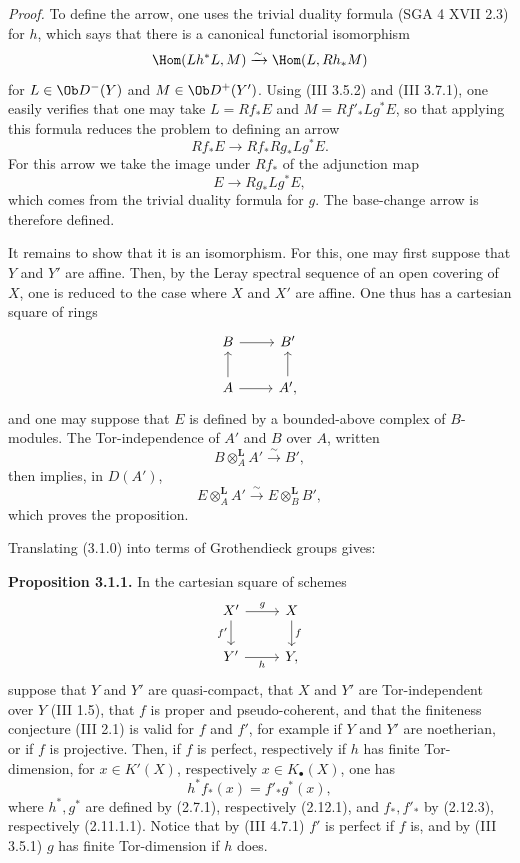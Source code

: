 \documentclass[11pt]{article}
\begin{document}
\emph{Proof.} To define the arrow, one uses the trivial duality formula (SGA 4 XVII 2.3) for \(h\), which says that there is a canonical functorial isomorphism
\[
 \Hom(Lh^*L,M)\xrightarrow{\sim}\Hom(L,Rh_*M)
\]
for \(L\in\Ob D^-(Y)\) and \(M\in\Ob D^+(Y')\). Using (III 3.5.2) and (III 3.7.1), one easily verifies that one may take \(L=Rf_*E\) and \(M=Rf'_*Lg^*E\), so that applying this formula reduces the problem to defining an arrow
\[
 Rf_*E\longrightarrow Rf_*Rg_*Lg^*E.
\]
For this arrow we take the image under \(Rf_*\) of the adjunction map
\[
 E\longrightarrow Rg_*Lg^*E,
\]
which comes from the trivial duality formula for \(g\). The base-change arrow is therefore defined.

It remains to show that it is an isomorphism. For this, one may first suppose that \(Y\) and \(Y'\) are affine. Then, by the Leray spectral sequence of an open covering of \(X\), one is reduced to the case where \(X\) and \(X'\) are affine. One thus has a cartesian square of rings
\[
\begin{tikzcd}
B\arrow[r] & B'\\
A\arrow[u]\arrow[r] & A'\arrow[u],
\end{tikzcd}
\]
and one may suppose that \(E\) is defined by a bounded-above complex of \(B\)-modules. The Tor-independence of \(A'\) and \(B\) over \(A\), written
\[
 B\otimes_A^{\mathbf L}A'\xrightarrow{\sim}B',
\]
then implies, in \(D(A')\),
\[
 E\otimes_A^{\mathbf L}A'\xrightarrow{\sim}E\otimes_B^{\mathbf L}B',
\]
which proves the proposition.

Translating (3.1.0) into terms of Grothendieck groups gives:

\textbf{Proposition 3.1.1.} In the cartesian square of schemes
\[
\begin{tikzcd}
X' \arrow[r,"g"]\arrow[d,"f'"'] & X\arrow[d,"f"]\\
Y' \arrow[r,"h"'] & Y,
\end{tikzcd}
\]
suppose that \(Y\) and \(Y'\) are quasi-compact, that \(X\) and \(Y'\) are Tor-independent over \(Y\) (III 1.5), that \(f\) is proper and pseudo-coherent, and that the finiteness conjecture (III 2.1) is valid for \(f\) and \(f'\), for example if \(Y\) and \(Y'\) are noetherian, or if \(f\) is projective. Then, if \(f\) is perfect, respectively if \(h\) has finite Tor-dimension, for \(x\in K'(X)\), respectively \(x\in K_{\bullet}(X)\), one has
\[
 h^* f_*(x)=f'_* g^*(x),
\]
where \(h^*,g^*\) are defined by (2.7.1), respectively (2.12.1), and \(f_*,f'_*\) by (2.12.3), respectively (2.11.1.1). Notice that by (III 4.7.1) \(f'\) is perfect if \(f\) is, and by (III 3.5.1) \(g\) has finite Tor-dimension if \(h\) does.
\end{document}
